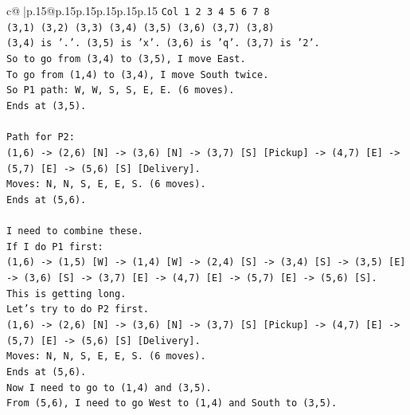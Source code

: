 \documentclass{article}
\begin{document}
{\begin{supertabular}{c@{$\;$}|p{.15\linewidth}@{}p{.15\linewidth}p{.15\linewidth}p{.15\linewidth}p{.15\linewidth}p{.15\linewidth}}
{{{\texttt{Col 1 2 3 4 5 6 7 8} \\
\texttt{(3,1) (3,2) (3,3) (3,4) (3,5) (3,6) (3,7) (3,8)} \\
\texttt{(3,4) is '.'. (3,5) is 'x'. (3,6) is 'q'. (3,7) is '2'.} \\
\texttt{So to go from (3,4) to (3,5), I move East.} \\
\texttt{To go from (1,4) to (3,4), I move South twice.} \\
\texttt{So P1 path: W, W, S, S, E, E. (6 moves).} \\
\texttt{Ends at (3,5).} \\
\\ 
\texttt{Path for P2:} \\
\texttt{(1,6) {-}> (2,6) {[}N{]} {-}> (3,6) {[}N{]} {-}> (3,7) {[}S{]} {[}Pickup{]} {-}> (4,7) {[}E{]} {-}> (5,7) {[}E{]} {-}> (5,6) {[}S{]} {[}Delivery{]}.} \\
\texttt{Moves: N, N, S, E, E, S. (6 moves).} \\
\texttt{Ends at (5,6).} \\
\\ 
\texttt{I need to combine these.} \\
\texttt{If I do P1 first:} \\
\texttt{(1,6) {-}> (1,5) {[}W{]} {-}> (1,4) {[}W{]} {-}> (2,4) {[}S{]} {-}> (3,4) {[}S{]} {-}> (3,5) {[}E{]} {-}> (3,6) {[}S{]} {-}> (3,7) {[}E{]} {-}> (4,7) {[}E{]} {-}> (5,7) {[}E{]} {-}> (5,6) {[}S{]}.} \\
\texttt{This is getting long.} \\
\texttt{Let's try to do P2 first.} \\
\texttt{(1,6) {-}> (2,6) {[}N{]} {-}> (3,6) {[}N{]} {-}> (3,7) {[}S{]} {[}Pickup{]} {-}> (4,7) {[}E{]} {-}> (5,7) {[}E{]} {-}> (5,6) {[}S{]} {[}Delivery{]}.} \\
\texttt{Moves: N, N, S, E, E, S. (6 moves).} \\
\texttt{Ends at (5,6).} \\
\texttt{Now I need to go to (1,4) and (3,5).} \\
\texttt{From (5,6), I need to go West to (1,4) and South to (3,5).} \\
}}}
\end{supertabular}}
\end{document}
